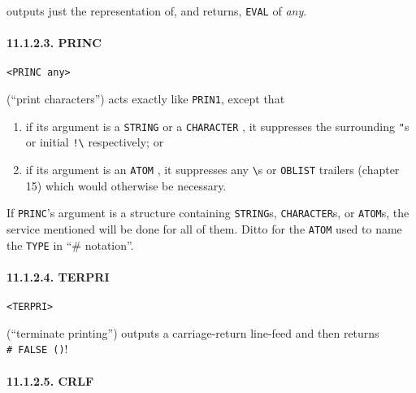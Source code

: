\documentclass[a4paper,]{article}
\providecommand{\tightlist}{%
  \setlength{\itemsep}{0pt}\setlength{\parskip}{0pt}}
\let\oldparagraph\paragraph
\renewcommand{\paragraph}[1]{\oldparagraph{#1}\mbox{}}
\begin{document}
 outputs just the representation of, and returns, \texttt{EVAL} of \emph{any}.

\paragraph{11.1.2.3. PRINC}\label{princ}

\begin{verbatim}
<PRINC any>
\end{verbatim}

 (``print characters'') acts exactly like \texttt{PRIN1}, except that

\begin{enumerate}
\def\labelenumi{\arabic{enumi}.}
\tightlist
\item
  if its argument is a \texttt{STRING}  or a \texttt{CHARACTER} , it
  suppresses the surrounding \texttt{"}s  or initial \texttt{!\textbackslash{}}
   respectively; or
\item
  if its argument is an \texttt{ATOM} , it suppresses any
  \texttt{\textbackslash{}}s or \texttt{OBLIST}  trailers (chapter
  15) which would otherwise be necessary.
\end{enumerate}

If \texttt{PRINC}'s argument is a structure containing \texttt{STRING}s, \texttt{CHARACTER}s, or \texttt{ATOM}s, the
service mentioned will be done for all of them. Ditto for the \texttt{ATOM} used to name the \texttt{TYPE} in ``\#
notation''. \index{\texttt{\#}}

\paragraph{11.1.2.4. TERPRI}\label{terpri}

\begin{verbatim}
<TERPRI>
\end{verbatim}

 (``terminate printing'') outputs a carriage-return line-feed and then returns
\texttt{\#\ FALSE\ ()}!

\paragraph{11.1.2.5. CRLF}\label{crlf}
\end{document}
